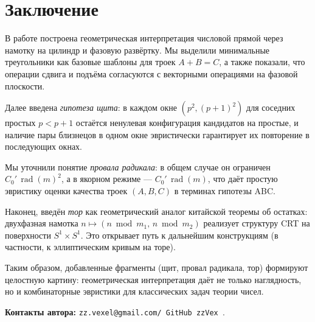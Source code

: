\documentclass[11pt,a4paper]{article}
\newcommand{\rad}{\operatorname{rad}}
\begin{document}
\section*{Заключение}

В работе построена геометрическая интерпретация числовой прямой через намотку на цилиндр
и фазовую развёртку. Мы выделили минимальные треугольники как базовые шаблоны для троек $A+B=C$,
а также показали, что операции сдвига и подъёма согласуются с векторными операциями на фазовой плоскости.

Далее введена \emph{гипотеза щита}: в каждом окне $(p^2,(p+1)^2)$ для соседних простых $p<p+1$
остаётся ненулевая конфигурация кандидатов на простые, и наличие пары близнецов в одном окне
эвристически гарантирует их повторение в последующих окнах.

Мы уточнили понятие \emph{провала радикала}: в общем случае он ограничен $C_0'\,\rad(m)^{2}$,
а в якорном режиме — $C_0'\,\rad(m)$, что даёт простую эвристику оценки качества троек $(A,B,C)$
в терминах гипотезы ABC.

Наконец, введён \emph{тор} как геометрический аналог китайской теоремы об остатках:
двухфазная намотка $n\mapsto (n\bmod m_1,\,n\bmod m_2)$ реализует структуру CRT на поверхности $S^1\times S^1$.
Это открывает путь к дальнейшим конструкциям (в частности, к эллиптическим кривым на торе).

Таким образом, добавленные фрагменты (щит, провал радикала, тор) формируют целостную картину:
геометрическая интерпретация даёт не только наглядность, но и комбинаторные эвристики
для классических задач теории чисел.



\bigskip
\noindent\textbf{Контакты автора:} \texttt{zz.vexel@gmail.com/ GitHub zzVex }.
\end{document}
